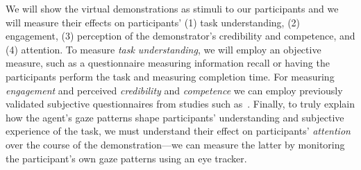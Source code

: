 We will show the virtual demonstrations as stimuli to our participants and we will measure their effects on participants' (1) task understanding, (2) engagement, (3) perception of the demonstrator's credibility and competence, and (4) attention. To measure \emph{task understanding}, we will employ an objective measure, such as a questionnaire measuring information recall or having the participants perform the task and measuring completion time. For measuring \emph{engagement} and perceived \emph{credibility} and \emph{competence} we can employ previously validated subjective questionnaires from studies such as~\citep{andrist2012designing}. Finally, to truly explain how the agent's gaze patterns shape participants' understanding and subjective experience of the task, we must understand their effect on participants' \emph{attention} over the course of the demonstration---we can measure the latter by monitoring the participant's own gaze patterns using an eye tracker. 